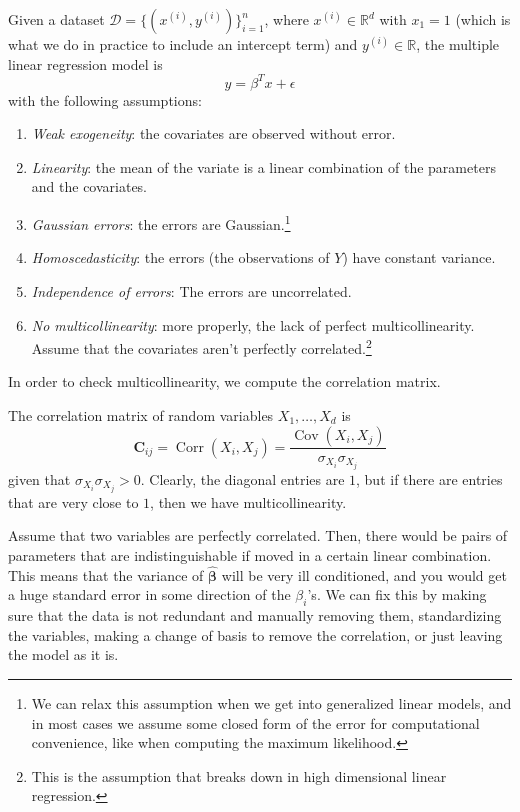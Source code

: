 \documentclass{article}
\DeclareMathOperator{\Cov}{Cov}
\DeclareMathOperator{\Corr}{Corr}
\begin{document}
    \begin{definition}
      Given a dataset $\mathcal{D} = \{(x^{(i)}, y^{(i)})\}_{i=1}^n$, where $x^{(i)} \in \mathbb{R}^d$ with $x_1 = 1$ (which is what we do in practice to include an intercept term) and $y^{(i)} \in \mathbb{R}$, the multiple linear regression model is 
      \begin{equation}
        y = \beta^T x + \epsilon
      \end{equation}
      with the following assumptions: 
      \begin{enumerate}
        \item \textit{Weak exogeneity}: the covariates are observed without error.
        \item \textit{Linearity}: the mean of the variate is a linear combination of the parameters and the covariates.
        \item \textit{Gaussian errors}: the errors are Gaussian.\footnote{We can relax this assumption when we get into generalized linear models, and in most cases we assume some closed form of the error for computational convenience, like when computing the maximum likelihood.}
        \item \textit{Homoscedasticity}: the errors (the observations of $Y$) have constant variance. 
        \item \textit{Independence of errors}: The errors are uncorrelated.
        \item \textit{No multicollinearity}: more properly, the lack of perfect multicollinearity. Assume that the covariates aren't perfectly correlated.\footnote{This is the assumption that breaks down in high dimensional linear regression.} 
      \end{enumerate}
    \end{definition}

    In order to check multicollinearity, we compute the correlation matrix. 

    \begin{definition}
      The correlation matrix of random variables $X_1, \ldots, X_d$ is 
      \[\mathbf{C}_{ij} = \Corr(X_i, X_j) = \frac{\Cov(X_i, X_j)}{\sigma_{X_i} \sigma_{X_j}}\]
      given that $\sigma_{X_i} \sigma_{X_j} > 0$. Clearly, the diagonal entries are $1$, but if there are entries that are very close to $1$, then we have multicollinearity. 
    \end{definition}

    Assume that two variables are perfectly correlated. Then, there would be pairs of parameters that are indistinguishable if moved in a certain linear combination. This means that the variance of $\hat{\boldsymbol{\beta}}$ will be very ill conditioned, and you would get a huge standard error in some direction of the $\beta_i$'s. We can fix this by making sure that the data is not redundant and manually removing them, standardizing the variables, making a change of basis to remove the correlation, or just leaving the model as it is. 
\end{document}
